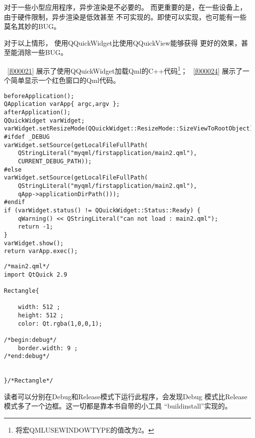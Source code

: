 对于一些小型应用程序，异步渲染是不必要的。
而更重要的是，在一些设备上，由于硬件限制，异步渲染是低效甚至
不可实现的。即使可以实现，也可能有一些莫名其妙的BUG。

对于以上情形，
使用QQuickWidget比使用QQuickView能够获得
更好的效果，甚至能消除一些BUG。

\lstlistingname\ \ref{f000021}
展示了使用QQuickWidget加载Qml的C{\sourcefonttwo{}+}{\sourcefonttwo{}+}代码\footnote{
将宏QML\underline{\hspace{0.5em}}USE\underline{\hspace{0.5em}}WINDOW\underline{\hspace{0.5em}}TYPE的值改为2。
}；
\lstlistingname\ \ref{f000024}
展示了一个简单显示一个红色窗口的Qml代码。

\FloatBarrier
\begin{lstlisting}[label=f000021,
caption=GoodLuck,
title=\lstlistingname\ \thelstlisting
,firstnumber=90]
beforeApplication();
QApplication varApp{ argc,argv };
afterApplication();
QQuickWidget varWidget;
varWidget.setResizeMode(QQuickWidget::ResizeMode::SizeViewToRootObject);
#ifdef _DEBUG
varWidget.setSource(getLocalFileFullPath(
    QStringLiteral("myqml/firstapplication/main2.qml"),
    CURRENT_DEBUG_PATH));
#else
varWidget.setSource(getLocalFileFullPath(
    QStringLiteral("myqml/firstapplication/main2.qml"),
    qApp->applicationDirPath()));
#endif
if (varWidget.status() != QQuickWidget::Status::Ready) {
    qWarning() << QStringLiteral("can not load : main2.qml");
    return -1;
}
varWidget.show();
return varApp.exec();
\end{lstlisting}          %
\FloatBarrier
\begin{lstlisting}[label=f000024,
caption=GoodLuck,
title=\lstlistingname\ \thelstlisting
]
/*main2.qml*/
import QtQuick 2.9

Rectangle{

    width: 512 ;
    height: 512 ;
    color: Qt.rgba(1,0,0,1);

/*begin:debug*/
    border.width: 9 ;
/*end:debug*/


}/*Rectangle*/
\end{lstlisting}          %

读者可以分别在Debug和Release模式下运行此程序，会发现Debug
模式比Release模式多了一个边框。这一切都是靠本书自带的小工具
“build\underline{\hspace{0.5em}}install”实现的。

